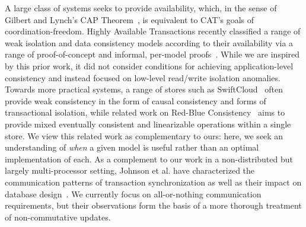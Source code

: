  A large class of systems
seeks to provide availability, which, in the sense of Gilbert and
Lynch's CAP Theorem~\cite{gilbert-cap}, is equivalent to CAT's goals
of coordination-freedom. Highly Available Transactions recently
classified a range of weak isolation and data consistency models
according to their availability via a range of proof-of-concept and
informal, per-model proofs~\cite{hat-vldb}. While we are inspired by
this prior work, it did not consider conditions for achieving
application-level consistency and instead focused on low-level
read/write isolation anomalies. Towards more practical systems, a
range of stores such as SwiftCloud~\cite{swift} often provide weak
consistency in the form of causal consistency and forms of
transactional isolation, while related work on Red-Blue
Consistency~\cite{redblue} aims to provide mixed eventually consistent
and linearizable operations within a single store. We view this
related work as complementary to ours: here, we seek an understanding
of \textit{when} a given model is useful rather than an optimal
implementation of each. As a complement to our work in a
non-distributed but largely multi-processor setting, Johnson et
al. have characterized the communication patterns of transaction
synchronization as well as their impact on database
design~\cite{shore-communication}. We currently focus on
all-or-nothing communication requirements, but their observations form
the basis of a more thorough treatment of non-commutative updates.

